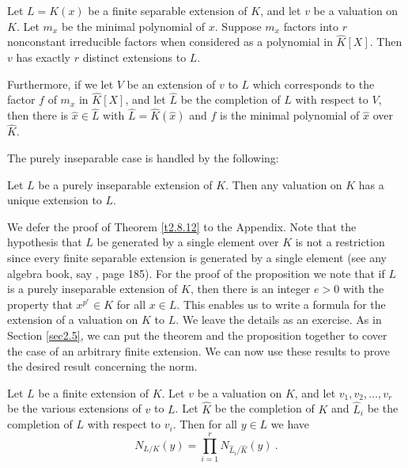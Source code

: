 \begin{theo}
\label{t2.8.12}
Let $L=K(x)$ be a finite separable extension of $K$, and let $v$ be a valuation on $K$. Let $m_{x}$ be the minimal polynomial of $x$. Suppose $m_{x}$ factors into $r$ nonconstant irreducible factors when considered as a polynomial in $\hat{K}[X]$. Then $v$ has exactly $r$ distinct extensions to $L$.
\end{theo}
Furthermore, if we let $V$ be an extension of $v$ to $L$ which corresponds to the factor $f$ of $m_{x}$ in $\hat{K}[X]$, and let $\hat{L}$ be the completion of $L$ with respect to $V$, then there is $\hat{x}\in\hat{L}$ with $\hat{L}=\hat{K}(\hat{x})$ and $f$ is the minimal polynomial of $\hat{x}$ over $\hat{K}$.

The purely inseparable case is handled by the following:

\begin{prop}
\label{p2.8.13}
Let $L$ be a purely inseparable extension of $K$. Then any valuation on $K$ has a unique extension to $L$.
\end{prop}

We defer the proof of Theorem \ref{t2.8.12} to the Appendix. Note that the hypothesis that $L$ be generated by a single element over $K$ is not a restriction since every finite separable extension is generated by a single element (see any algebra book, say \cite{r1.2}, page 185). For the proof of the proposition we note that if $L$ is a purely inseparable extension of $K$, then there is an integer $e>0$ with the property that $x^{p^e}\in K$ for all $x\in L$. This enables us to write a formula for the extension of a valuation on $K$ to $L$. We leave the details as an exercise. As in Section \ref{sec2.5}, we can put the theorem and the proposition together to cover the case of an arbitrary finite extension. We can now use these results to prove the desired result concerning the norm.

\begin{theo}
\label{t2.8.13}
Let $L$ be a finite extension of $K$. Let $v$ be a valuation on $K$, and let $v_{1},v_{2},\ldots,v_{r}$ be the various extensions of $v$ to $L$. Let $\hat{K}$ be the completion of $K$ and $\hat{L}_{i}$ be the completion of $L$ with respect to $v_{i}$. Then for all $y\in L$ we have
$$
N_{L/K}(y)=\prod_{i=1}^{r}N_{\hat{L}_{i}/\hat{K}}(y)\ .
$$
\end{theo}

